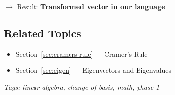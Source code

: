 $\rightarrow$ Result: \textbf{Transformed vector in our language}

\subsection*{Related Topics}
\begin{itemize}[nosep]
  \item Section~\ref{sec:cramers-rule} --- Cramer's Rule
  \item Section~\ref{sec:eigen} --- Eigenvectors and Eigenvalues
\end{itemize}

\bigskip
\noindent\textit{Tags: linear-algebra, change-of-basis, math, phase-1}
